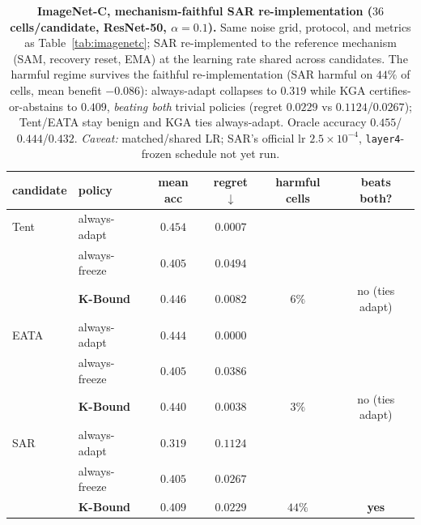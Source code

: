 \documentclass[conference]{IEEEtran}
\theoremstyle{plain}
\theoremstyle{definition}
\begin{document}
\begin{table}[t]\centering\small
\begin{tabular}{llcccc}
\toprule
candidate & policy & mean acc & regret$\downarrow$ & harmful cells & beats both? \\
\midrule
Tent & always-adapt     & $\mathbf{0.454}$ & $0.0007$          &        & \\
     & always-freeze    & $0.405$          & $0.0494$          &        & \\
     & \textbf{K-Bound} & $0.446$          & $0.0082$          & $6\%$  & no (ties adapt) \\
\midrule
EATA & always-adapt     & $\mathbf{0.444}$ & $0.0000$          &        & \\
     & always-freeze    & $0.405$          & $0.0386$          &        & \\
     & \textbf{K-Bound} & $0.440$          & $0.0038$          & $3\%$  & no (ties adapt) \\
\midrule
SAR  & always-adapt     & $0.319$          & $0.1124$          &        & \\
     & always-freeze    & $0.405$          & $0.0267$          &        & \\
     & \textbf{K-Bound} & $\mathbf{0.409}$ & $\mathbf{0.0229}$ & $44\%$ & \textbf{yes} \\
\bottomrule
\end{tabular}
\caption{\textbf{ImageNet-C, mechanism-faithful SAR re-implementation ($36$ cells/candidate,
ResNet-50, $\alpha{=}0.1$).} Same noise grid, protocol, and metrics as Table~\ref{tab:imagenetc};
SAR re-implemented to the reference mechanism (SAM, recovery reset, EMA) at the learning rate shared
across candidates. The harmful regime survives the faithful re-implementation (SAR harmful on $44\%$
of cells, mean benefit $-0.086$): always-adapt collapses to $0.319$ while \textsc{KGA}
certifies-or-abstains to $0.409$, \emph{beating both} trivial policies (regret $0.0229$ vs
$0.1124$/$0.0267$); Tent/EATA stay benign and \textsc{KGA} ties always-adapt. Oracle accuracy
$0.455$/$0.444$/$0.432$. \emph{Caveat:} matched/shared LR; SAR's official lr $2.5{\times}10^{-4}$,
\texttt{layer4}-frozen schedule not yet run.}
\label{tab:imagenetc-faithful}
\end{table}
\end{document}
